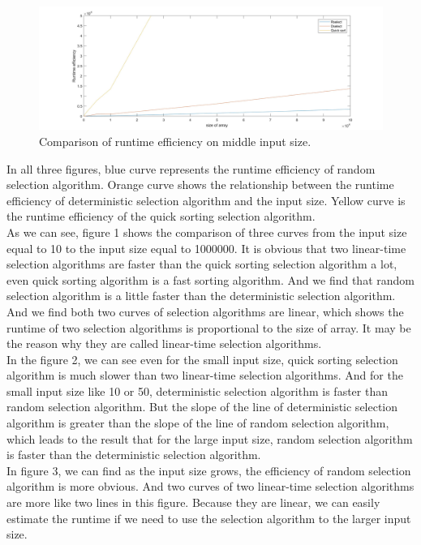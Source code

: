 \documentclass{article}
\begin{document}
\begin{figure}[H]
\centering
\includegraphics[width=\textwidth]{3.jpg}
\caption{Comparison of runtime efficiency on middle input size.}
\end{figure}
In all three figures, blue curve represents the runtime efficiency of random selection algorithm. Orange curve shows the relationship between the runtime efficiency of deterministic selection algorithm and the input size. Yellow curve is the runtime efficiency of the quick sorting selection algorithm. \\
As we can see, figure 1 shows the comparison of three curves from the input size equal to 10 to the input size equal to 1000000. It is obvious that two linear-time selection algorithms are faster than the quick sorting selection algorithm a lot, even quick sorting algorithm is a fast sorting algorithm. And we find that random selection algorithm is a little faster than the deterministic selection algorithm. And we find both two curves of selection algorithms are linear, which shows the runtime of two selection algorithms is proportional to the size of array. It may be the reason why they are called linear-time selection algorithms.\\
In the figure 2, we can see even for the small input size, quick sorting selection algorithm is much slower than two linear-time selection algorithms. And for the small input size like 10 or 50, deterministic selection algorithm is faster than random selection algorithm. But the slope of the line of deterministic selection algorithm is greater than the slope of the line of random selection algorithm, which leads to the result that for the large input size, random selection algorithm is faster than the deterministic selection algorithm. \\
In figure 3, we can find as the input size grows, the efficiency of random selection algorithm is more obvious. And two curves of two linear-time selection algorithms are more like two lines in this figure. Because they are linear, we can easily estimate the runtime if we need to use the selection algorithm to the larger input size. \\
\end{document}
